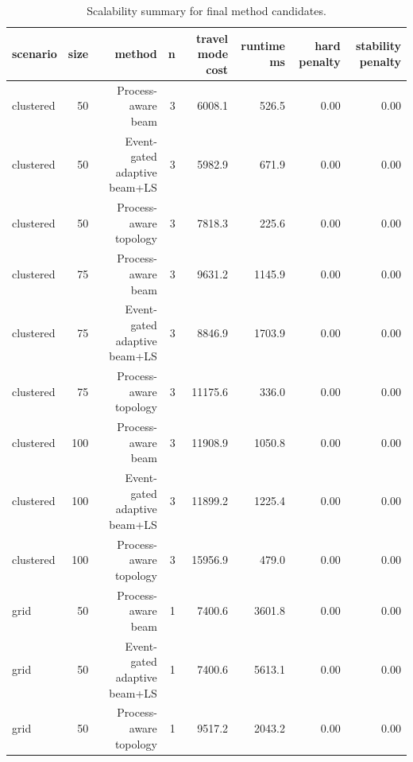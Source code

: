 \begin{table}[t]
\centering
\caption{Scalability summary for final method candidates.}
\label{tab:scalability-summary}
\begin{tabular}{lrrrrrrr}
\toprule
scenario & size & method & n & travel mode cost & runtime ms & hard penalty & stability penalty \\
\midrule
clustered & 50 & Process-aware beam & 3 & 6008.1 & 526.5 & 0.00 & 0.00 \\
clustered & 50 & Event-gated adaptive beam+LS & 3 & 5982.9 & 671.9 & 0.00 & 0.00 \\
clustered & 50 & Process-aware topology & 3 & 7818.3 & 225.6 & 0.00 & 0.00 \\
clustered & 75 & Process-aware beam & 3 & 9631.2 & 1145.9 & 0.00 & 0.00 \\
clustered & 75 & Event-gated adaptive beam+LS & 3 & 8846.9 & 1703.9 & 0.00 & 0.00 \\
clustered & 75 & Process-aware topology & 3 & 11175.6 & 336.0 & 0.00 & 0.00 \\
clustered & 100 & Process-aware beam & 3 & 11908.9 & 1050.8 & 0.00 & 0.00 \\
clustered & 100 & Event-gated adaptive beam+LS & 3 & 11899.2 & 1225.4 & 0.00 & 0.00 \\
clustered & 100 & Process-aware topology & 3 & 15956.9 & 479.0 & 0.00 & 0.00 \\
grid & 50 & Process-aware beam & 1 & 7400.6 & 3601.8 & 0.00 & 0.00 \\
grid & 50 & Event-gated adaptive beam+LS & 1 & 7400.6 & 5613.1 & 0.00 & 0.00 \\
grid & 50 & Process-aware topology & 1 & 9517.2 & 2043.2 & 0.00 & 0.00 \\
\bottomrule
\end{tabular}
\end{table}
